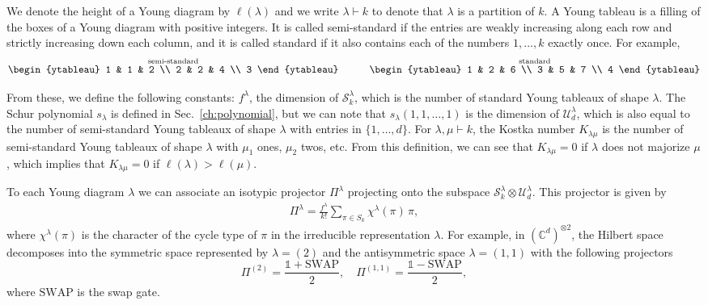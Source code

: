 \documentclass[11pt,a4paper]{report}
\newcommand{\ot}{\otimes}
\newcommand{\one}{\mathds{1}}
\newcommand{\I}{\one}
\newcommand{\C}{\mathds{C}}
\begin{document}
We denote the height of a Young diagram by $\ell(\lambda)$ and we write $\lambda \vdash k$ to denote that $\lambda$ is a partition of $k$.
A Young tableau is a filling of the boxes of a Young diagram with positive integers. It is called semi-standard if the entries are weakly increasing along each row and strictly increasing down each column, and it is called standard if it also contains each of the numbers $1,\dots,k$ exactly once. For example,
\begin{equation}
    \overset{\text{semi-standard}}{
    \begin{ytableau}
        1 & 1 & 2 \\
        2 & 2 & 4 \\
        3
    \end{ytableau}
    }
    \quad \quad \quad
    \overset{\text{standard}}{
    \begin{ytableau}
        1 & 2 & 6 \\
        3 & 5 & 7 \\
        4
    \end{ytableau}
    }
\end{equation}

From these, we define the following constants: $f^\lambda$, the dimension of $\mathcal{S}_k^\lambda$, which is the number of standard Young tableaux of shape $\lambda$. The Schur polynomial $s_\lambda$ is defined in Sec.~\ref{ch:polynomial}, but we can note that $s_\lambda(1,1,\dots,1)$ is the dimension of $\mathcal{U}^\lambda_d$, which is also equal to the number of semi-standard Young tableaux of shape $\lambda$ with entries in $\{1, \dots, d\}$.
For $\lambda, \mu \vdash k$, the Kostka number $K_{\lambda\mu}$ is the number of semi-standard Young tableaux of shape $\lambda$ with $\mu_1$ ones, $\mu_2$ twos, etc.
From this definition, we can see that $K_{\lambda\mu}=0$ if $\lambda$ does not majorize $\mu$, which implies that $K_{\lambda\mu}=0$ if $\ell(\lambda) > \ell(\mu)$.

To each Young diagram $\lambda$ we can associate an isotypic projector $\Pi^\lambda$ projecting onto the subspace $\mathcal{S}^\lambda_k \ot \mathcal{U}^\lambda_d$. This projector is given by
\begin{align}\label{eq:isotypic}
    \Pi^\lambda = \frac{f^\lambda}{k!}\sum_{\pi \in S_k} \chi^\lambda(\pi)\, \pi,
\end{align}
where $\chi^\lambda(\pi)$ is the character of the cycle type of $\pi$ in the irreducible representation $\lambda$.
For example, in $(\C^d)^{\otimes 2}$, the Hilbert space decomposes into the symmetric space represented by $\lambda = (2)$ and the antisymmetric space $\lambda = (1,1)$ with the following projectors
\begin{equation}
    \Pi^{(2)} = \frac{\I + \text{SWAP}}{2}, \quad \Pi^{(1,1)} = \frac{\I - \text{SWAP}}{2},
\end{equation}
where $\text{SWAP}$ is the swap gate.
\end{document}
